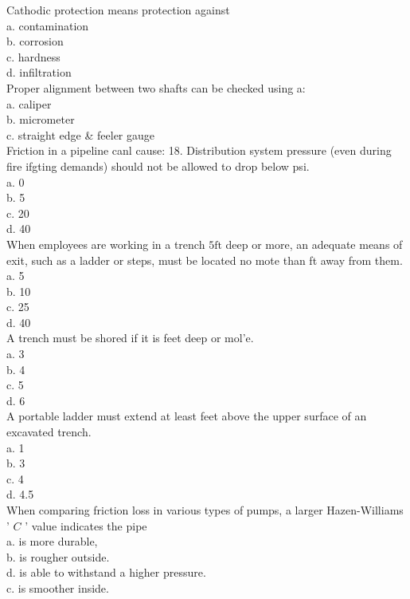 Cathodic protection means protection against\\
a. contamination\\
b. corrosion\\
c. hardness\\
d. infiltration\\

Proper alignment between two shafts can be checked using a:\\
a. caliper\\
b. micrometer\\
c. straight edge \& feeler gauge\\

Friction in a pipeline canl cause: 18. Distribution system pressure (even during fire ifgting demands) should not be allowed to drop below psi.\\
a. 0\\
b. 5\\
c. 20\\
d. 40\\

When employees are working in a trench $5 \mathrm{ft}$ deep or more, an adequate means of exit, such as a ladder or steps, must be located no mote than ft away from them.\\
a. 5\\
b. 10\\
c. 25\\
d. 40\\

A trench must be shored if it is feet deep or mol'e.\\
a. 3\\
b. 4\\
c. 5\\
d. 6\\

A portable ladder must extend at least feet above the upper surface of an excavated trench.\\
a. 1\\
b. 3\\
c. 4\\
d. 4.5\\

When comparing friction loss in various types of pumps, a larger Hazen-Williams ' $C$ ' value indicates the pipe\\
a. is more durable,\\
b. is rougher outside.\\
d. is able to withstand a higher pressure.\\
c. is smoother inside.\\

